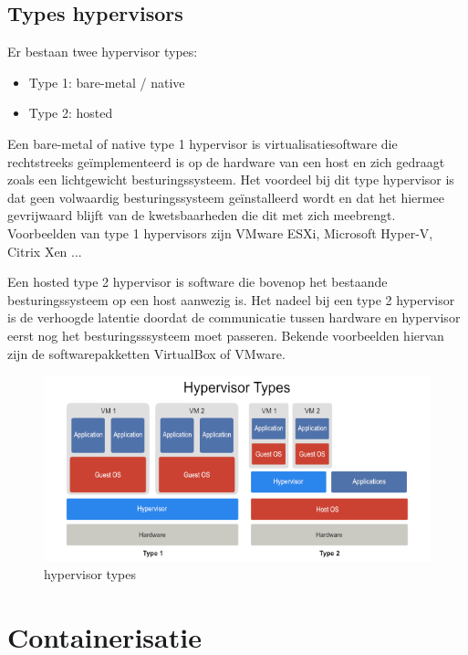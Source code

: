 \subsection{Types hypervisors}

Er bestaan twee hypervisor types:
\begin{itemize}
    \item Type 1: bare-metal / native
    \item Type 2: hosted
\end{itemize}

Een bare-metal of native type 1 hypervisor is virtualisatiesoftware die rechtstreeks geïmplementeerd is op de hardware van een host en zich gedraagt zoals een lichtgewicht besturingssysteem. Het voordeel bij dit type hypervisor is dat geen volwaardig besturingssysteem geïnstalleerd wordt en dat het hiermee gevrijwaard blijft van de kwetsbaarheden die dit met zich meebrengt. Voorbeelden van type 1 hypervisors zijn VMware ESXi, Microsoft Hyper-V, Citrix Xen ... 

Een hosted type 2 hypervisor is software die bovenop het bestaande besturingssysteem op een host aanwezig is. Het nadeel bij een type 2 hypervisor is de verhoogde latentie doordat de communicatie tussen hardware en hypervisor eerst nog het besturingsssysteem moet passeren. Bekende voorbeelden hiervan zijn de softwarepakketten VirtualBox of VMware.

\begin{figure}[h]
    \centering
    \includegraphics[scale=.7]{img/Hypervisor-Types.png}
    \caption{hypervisor types \autocite{Vembu2019}}
    \label{fig}
\end{figure}


\section{Containerisatie}

